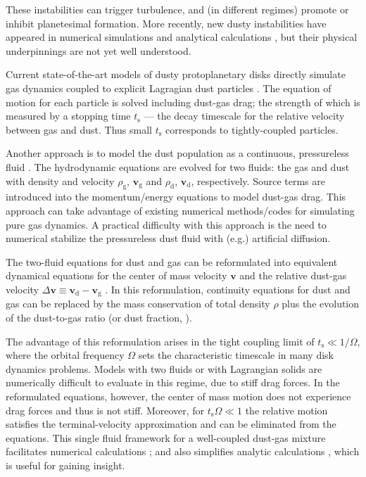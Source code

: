 \documentclass[iop, numberedappendix]{emulateapj}
\newcommand{\rhod}{\rho_\mathrm{d}}
\newcommand{\rhog}{\rho_\mathrm{g}}
\newcommand{\tstop}{t_\mathrm{s}}
\begin{document}
These instabilities can trigger turbulence, and (in different regimes) promote or inhibit  
planetesimal formation. 
More recently, new 
dusty instabilities have appeared in numerical  
simulations \citep{loren15,loren16,lamb16} and analytical calculations \citep{squire17},   
but their physical underpinnings are not yet well 
understood. 



Current state-of-the-art models of dusty protoplanetary
disks directly simulate gas dynamics coupled to explicit
Lagragian dust particles
\citep{johansen2006, nelson10,bai10,yang14,zhu14,gibbons15,simon16,baruteau16}. 
The equation of motion for each particle is solved 
including dust-gas drag; the strength of which is measured 
by a stopping time $\tstop$ --- the decay timescale for the 
relative velocity between gas and dust. Thus small $\tstop$
corresponds to tightly-coupled particles. 


Another approach is to model the dust population as a continuous, pressureless
fluid 
\citep{paardekooper06b,meheut12,laibe12,loren14,fu14b,surville16}. The 
hydrodynamic equations are evolved for two fluids: the gas and dust with density and
velocity $\rhog$, $\bm{v}_\mathrm{g}$ and $\rhod$, 
$\bm{v}_\mathrm{d}$, respectively. Source terms are introduced into
the momentum/energy equations to model dust-gas drag. This approach
can take advantage of existing numerical methods/codes for
simulating pure gas dynamics. A practical difficulty with this approach is the need to numerical stabilize the pressureless dust fluid with (e.g.) artificial diffusion.



The two-fluid equations for dust and gas can be reformulated into 
equivalent dynamical equations for the center of mass velocity $\bm{v}$
and the relative dust-gas velocity  $\Delta\bm{v}\equiv \bm{v}_\mathrm{d}-\bm{v}_\mathrm{g}$ 
\citep{youdin05a}. In this reformulation, continuity equations for dust and gas can be replaced 
by the mass conservation of total density $\rho$ plus the evolution of the dust-to-gas ratio 
(or dust fraction, \citealp{laibe14}).

The advantage of this reformulation arises in the tight coupling limit of  $\tstop \ll 1/\Omega$, where the orbital frequency $\Omega$ sets the characteristic timescale in many disk dynamics problems.
Models with two fluids or with Lagrangian solids are numerically difficult to evaluate in this regime, due to stiff drag forces.  
In the reformulated equations, however, the center of mass motion does
not experience drag forces and thus is not stiff.  Moreover,
for $\tstop\Omega\ll 1$ the relative motion satisfies the terminal-velocity approximation and can be eliminated from the equations.  This single fluid framework for a well-coupled dust-gas mixture facilitates numerical calculations \citep{price15}; and also simplifies analytic calculations \citep{youdin05a,jacquet11}, which is useful for gaining insight.  
\end{document}
